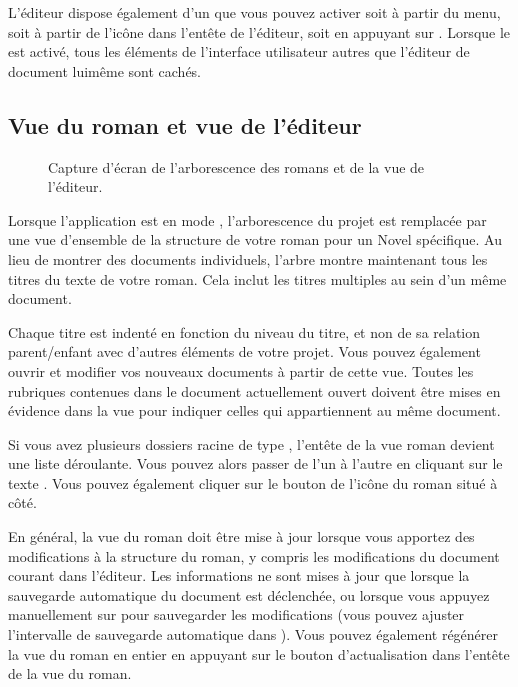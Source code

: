 \documentclass[a4paper,11pt,french]{sphinxmanual}
\begin{document}
\sphinxAtStartPar
L’éditeur dispose également d’un  que vous pouvez activer soit à partir du menu, soit à partir de l’icône dans l’en\sphinxhyphen{}tête de l’éditeur, soit en appuyant sur . Lorsque le  est activé, tous les éléments de l’interface utilisateur autres que l’éditeur de document lui\sphinxhyphen{}même sont cachés.


\subsection{Vue du roman et vue de l’éditeur}
\label{\detokenize{usage_breakdown:novel-view-and-editor-view}}
\begin{figure}[htbp]
\centering
\capstart

\noindent{}
\caption{Capture d’écran de l’arborescence des romans et de la vue de l’éditeur.}\label{\detokenize{usage_breakdown:id2}}\end{figure}

\sphinxAtStartPar
Lorsque l’application est en mode , l’arborescence du projet est remplacée par une vue d’ensemble de la structure de votre roman pour un Novel {\hyperref[\detokenize{int_glossary:term-Root-Folder}]{}} spécifique. Au lieu de montrer des documents individuels, l’arbre montre maintenant tous les titres du texte de votre roman. Cela inclut les titres multiples au sein d’un même document.

\sphinxAtStartPar
Chaque titre est indenté en fonction du niveau du titre, et non de sa relation parent/enfant avec d’autres éléments de votre projet. Vous pouvez également ouvrir et modifier vos nouveaux documents à partir de cette vue. Toutes les rubriques contenues dans le document actuellement ouvert doivent être mises en évidence dans la vue pour indiquer celles qui appartiennent au même document.

\sphinxAtStartPar
Si vous avez plusieurs dossiers racine de type , l’en\sphinxhyphen{}tête de la vue roman devient une liste déroulante. Vous pouvez alors passer de l’un à l’autre en cliquant sur le texte . Vous pouvez également cliquer sur le bouton de l’icône du roman situé à côté.

\sphinxAtStartPar
En général, la vue du roman doit être mise à jour lorsque vous apportez des modifications à la structure du roman, y compris les modifications du document courant dans l’éditeur. Les informations ne sont mises à jour que lorsque la sauvegarde automatique du document est déclenchée, ou lorsque vous appuyez manuellement sur  pour sauvegarder les modifications (vous pouvez ajuster l’intervalle de sauvegarde automatique dans ). Vous pouvez également régénérer la vue du roman en entier en appuyant sur le bouton d’actualisation dans l’en\sphinxhyphen{}tête de la vue du roman.
\end{document}
